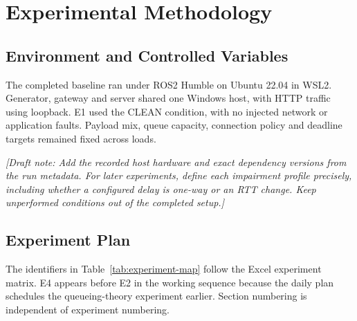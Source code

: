 \documentclass[10pt,a4paper,twocolumn,twoside]{tau-class/tau}
\newcommand{\draftnote}[1]{\par\noindent\textit{[Draft note: #1]}\par}
\begin{document}
\section{Experimental Methodology}
\label{sec:method}

\subsection{Environment and Controlled Variables}
The completed baseline ran under ROS2 Humble on Ubuntu 22.04 in WSL2.
Generator, gateway and server shared one Windows host, with HTTP traffic
using loopback. E1 used the CLEAN condition, with no injected network or
application faults. Payload mix, queue capacity, connection policy and
deadline targets remained fixed across loads.

\draftnote{Add the recorded host hardware and exact dependency versions
from the run metadata. For later experiments, define each impairment
profile precisely, including whether a configured delay is one-way or an
RTT change. Keep unperformed conditions out of the completed setup.}

\subsection{Experiment Plan}
The identifiers in Table~\ref{tab:experiment-map} follow the Excel experiment
matrix. E4 appears before E2 in the working sequence because the daily plan
schedules the queueing-theory experiment earlier. Section numbering is
independent of experiment numbering.
\end{document}
